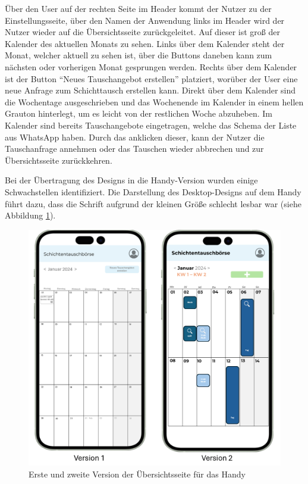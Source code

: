 Über den User auf der rechten Seite im Header kommt der Nutzer zu der Einstellungsseite, über den Namen der Anwendung links im Header wird der Nutzer wieder auf die Übersichtsseite zurückgeleitet. 
Auf dieser ist groß der Kalender des aktuellen Monats zu sehen. 
Links über dem Kalender steht der Monat, welcher aktuell zu sehen ist, über die Buttons daneben kann zum nächsten oder vorherigen Monat gesprungen werden. 
Rechts über dem Kalender ist der Button “Neues Tauschangebot erstellen” platziert, worüber der User eine neue Anfrage zum Schichttausch erstellen kann. 
Direkt über dem Kalender sind die Wochentage ausgeschrieben und das Wochenende im Kalender in einem hellen Grauton hinterlegt, um es leicht von der restlichen Woche abzuheben. 
Im Kalender sind bereits Tauschangebote eingetragen, welche das Schema der Liste aus WhatsApp haben. 
Durch das anklicken dieser, kann der Nutzer die Tauschanfrage annehmen oder das Tauschen wieder abbrechen und zur Übersichtsseite zurückkehren.

Bei der Übertragung des Designs in die Handy-Version wurden einige Schwachstellen identifiziert. Die Darstellung des Desktop-Designs auf dem Handy führt dazu, dass die Schrift aufgrund der kleinen Größe schlecht lesbar war (siehe Abbildung \ref{Version12_Handy}). 

\begin{figure}[h]
    \centering
    \includegraphics[clip,width=0.75\linewidth]{images/Version12_Handy.png}
    \caption[Erste und zweite Version der Übersichtsseite für das Handy]{Erste und zweite Version der Übersichtsseite für das Handy}
    \label{Version12_Handy}
\end{figure}

